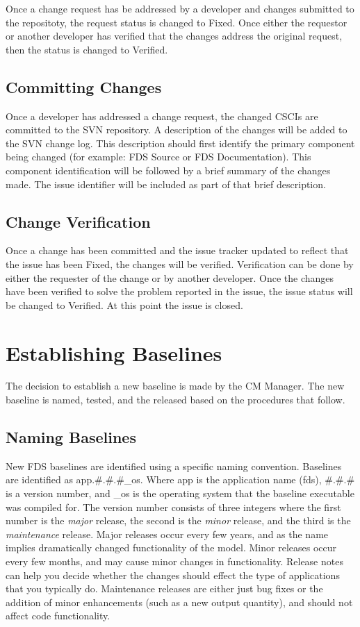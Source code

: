 \documentclass[11pt]{book}
\begin{document}
Once a change request has be addressed by a developer and changes submitted to the repositoty, the request status
is changed to {\ct Fixed}.  Once either the requestor or another developer has verified that the changes address 
the original request, then the status is changed to {\ct Verified}.  


\subsection{Committing Changes}

Once a developer has addressed a change request, the changed CSCIs are committed to the SVN repository.  A description
of the changes will be added to the SVN change log.  This description should first identify the primary component being 
changed (for example: FDS Source or FDS Documentation).  This component identification will be followed by a brief 
summary of the changes made.  The issue identifier will be included as part of that brief description.

\subsection{Change Verification}

Once a change has been committed and the issue tracker updated to reflect that the issue has been {\ct Fixed},
the changes will be verified.  Verification can be done by either the requester of the change or by another 
developer.  Once the changes have been verified to solve the problem reported in the issue, the issue status will
be changed to {\ct Verified}.  At this point the issue is closed.


\section{Establishing Baselines}

The decision to establish a new baseline is made by the CM Manager.  The new baseline is named, tested, and the
released based on the procedures that follow.

\subsection{Naming Baselines}

New FDS baselines are identified using a specific naming convention. Baselines are identified as app.\#.\#.\#\_os. 
Where app is the application name (fds), \#.\#.\# is a version number, and \_os is the operating system that the
baseline executable was compiled for.  The version number consists of three integers where the first number
is the {\em major} release, the second is the {\em minor} release, and the third is the {\em maintenance}
release.  Major releases occur every few years, and as the name implies dramatically changed functionality of the
model. Minor releases occur every few months, and may cause minor changes in functionality. 
Release notes can help you decide whether the changes should effect the type of applications that you typically do.
Maintenance releases are either just bug fixes or the addition of minor enhancements (such as a new output quantity),
and should not affect code functionality.
\end{document}
